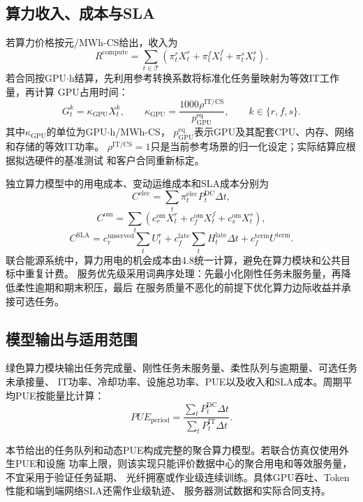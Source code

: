 \subsection{算力收入、成本与SLA}

若算力价格按元/MWh-CS给出，收入为
\begin{equation}
R^{\mathrm{compute}}
=\sum_{t\in\mathcal T}
\left(\pi_t^rX_t^r+\pi_t^fX_t^f+\pi_t^sX_t^s\right).
\label{eq:dc-revenue-mwhcs}
\end{equation}
若合同按GPU$\cdot$h结算，先利用参考转换系数将标准化任务量映射为等效IT工作量，再计算
GPU占用时间：
\begin{equation}
G_t^k
=\kappa_{\mathrm{GPU}}X_t^k,
\qquad
\kappa_{\mathrm{GPU}}
=\frac{1000\rho^{\mathrm{IT/CS}}}
{p_{\mathrm{GPU}}^{\mathrm{eq}}},
\qquad k\in\{r,f,s\}.
\label{eq:dc-gpuh}
\end{equation}
其中$\kappa_{\mathrm{GPU}}$的单位为GPU$\cdot$h/MWh-CS，
$p_{\mathrm{GPU}}^{\mathrm{eq}}$表示GPU及其配套CPU、内存、网络和存储的等效IT功率。
$\rho^{\mathrm{IT/CS}}=1$只是当前参考场景的归一化设定；实际结算应根据拟选硬件的基准测试
和客户合同重新标定。

独立算力模型中的用电成本、变动运维成本和SLA成本分别为
\begin{equation}
C^{\mathrm{elec}}
=\sum_t\pi_t^{\mathrm{elec}}P_t^{\mathrm{DC}}\Delta t,
\end{equation}
\begin{equation}
C^{\mathrm{om}}
=\sum_t\left(c_r^{\mathrm{om}}X_t^r+c_f^{\mathrm{om}}X_t^f
+c_s^{\mathrm{om}}X_t^s\right),
\end{equation}
\begin{equation}
C^{\mathrm{SLA}}
=c_r^{\mathrm{unserved}}\sum_tU_t^r
+c_f^{\mathrm{late}}\sum_tH_t^{\mathrm{late}}\Delta t
+c_f^{\mathrm{term}}U^{\mathrm{term}}.
\label{eq:dc-sla-cost}
\end{equation}
联合能源系统中，算力用电的机会成本由4.8统一计算，避免在算力模块和公共目标中重复计费。
服务优先级采用词典序处理：先最小化刚性任务未服务量，再降低柔性逾期和期末积压，最后
在服务质量不恶化的前提下优化算力边际收益并承接可选任务。

\subsection{模型输出与适用范围}

绿色算力模块输出任务完成量、刚性任务未服务量、柔性队列与逾期量、可选任务未承接量、
IT功率、冷却功率、设施总功率、PUE以及收入和SLA成本。周期平均PUE按能量比计算：
\begin{equation}
PUE_{\mathrm{period}}
=\frac{\sum_tP_t^{\mathrm{DC}}\Delta t}
{\sum_tP_t^{\mathrm{IT}}\Delta t}.
\label{eq:dc-period-pue}
\end{equation}

本节给出的任务队列和动态PUE构成完整的聚合算力模型。若联合仿真仅使用外生PUE和设施
功率上限，则该实现只能评价数据中心的聚合用电和等效服务量，不宜采用于验证任务延期、
光纤拥塞或作业级连续训练。具体GPU吞吐、Token性能和端到端网络SLA还需作业级轨迹、
服务器测试数据和实际合同支持。
